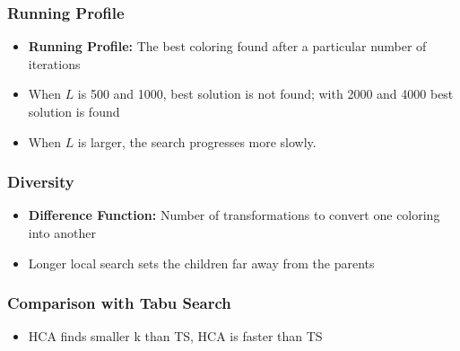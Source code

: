 \documentclass{beamer}
\begin{document}
\begin{frame}
\frametitle{Running Profile}
\begin{itemize}
\item {\bf Running Profile:} The best coloring found after a particular number of iterations
\item When $L$ is 500 and 1000, best solution is not found; with 2000 and 4000 best solution is found
\item When $L$ is larger, the search progresses more slowly.
\end{itemize}
\end{frame}

\begin{frame}
\frametitle{Diversity}
\begin{itemize}
\item {\bf Difference Function:} Number of transformations to convert one coloring into another 
\item Longer local search sets the children far away from the parents
\end{itemize}
\end{frame}

\begin{frame}
\frametitle{Comparison with Tabu Search}
\begin{itemize}
\item HCA finds smaller k than TS, HCA is faster than TS
\end{itemize}
\end{frame}
\end{document}
